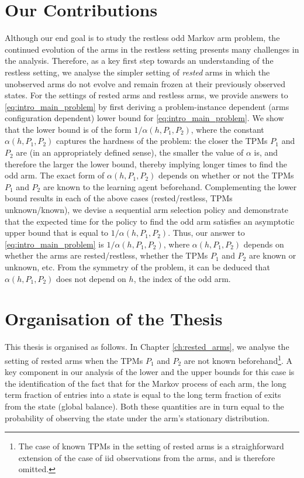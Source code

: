 \section{Our Contributions}
Although our end goal is to study the restless odd Markov arm problem, the continued evolution of the arms in the restless setting presents many challenges in the analysis. Therefore, as a key first step towards an understanding of the restless setting, we analyse the simpler setting of {\em rested} arms in which the unobserved arms do not evolve and remain frozen at their previously observed states. For the settings of rested arms and restless arms, we provide answers to \eqref{eq:intro_main_problem} by first deriving a problem-instance dependent (arms configuration dependent) lower bound for \eqref{eq:intro_main_problem}. We show that the lower bound is of the form $1/\alpha(h, P_{1}, P_{2})$, where the constant $\alpha(h, P_{1}, P_{2})$ captures the hardness of the problem: the closer the TPMs $P_{1}$ and $P_{2}$ are (in an appropriately defined sense), the smaller the value of $\alpha$ is, and therefore the larger the lower bound, thereby implying longer times to find the odd arm. The exact form of $\alpha(h, P_{1}, P_{2})$ depends on whether or not the TPMs $P_{1}$ and $P_{2}$ are known to the learning agent beforehand. Complementing the lower bound results in each of the above cases (rested/restless, TPMs unknown/known), we devise a sequential arm selection policy and demonstrate that the expected time for the policy to find the odd arm satisfies an asymptotic upper bound that is equal to $1/\alpha(h, P_{1}, P_{2})$. Thus, our answer to \eqref{eq:intro_main_problem} is $1/\alpha(h, P_{1}, P_{2})$, where $\alpha(h,P_1,P_2)$ depends on whether the arms are rested/restless, whether the TPMs $P_1$ and $P_2$ are known or unknown, etc. From the symmetry of the problem, it can be deduced that $\alpha(h,P_1,P_2)$ does not depend on $h$, the index of the odd arm. 

\section{Organisation of the Thesis}
This thesis is organised as follows. In Chapter \ref{ch:rested_arms}, we analyse the setting of rested arms when the TPMs $P_1$ and $P_2$ are not known beforehand\footnote{The case of known TPMs in the setting of rested arms is a straighforward extension of the case of iid observations from the arms, and is therefore omitted.}. A key component in our analysis of the lower and the upper bounds for this case is the identification of the fact that for the Markov process of each arm, the long term fraction of entries into a state is equal to the long term fraction of exits from the state (global balance). Both these quantities are in turn equal to the probability of observing the state under the arm's stationary distribution.

